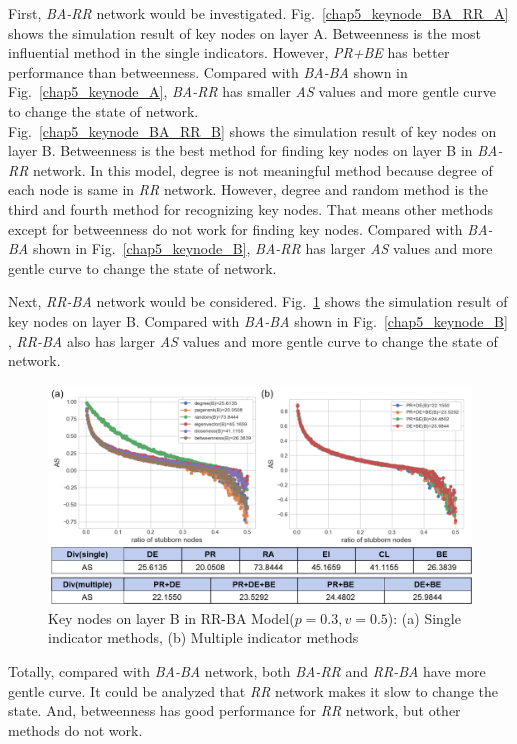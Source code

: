 First, \textit{BA-RR} network would be investigated.
Fig.~\ref{chap5_keynode_BA_RR_A} shows the simulation result of key nodes on layer A. Betweenness is the most influential method in the single indicators. However, \textit{PR+BE} has better performance than betweenness. Compared with \textit{BA-BA} shown in Fig.~\ref{chap5_keynode_A}, \textit{BA-RR} has smaller \textit{AS} values and more gentle curve to change the state of network.\\
Fig.~\ref{chap5_keynode_BA_RR_B} shows the simulation result of key nodes on layer B. Betweenness is the best method for finding key nodes on layer B in \textit{BA-RR} network. In this model, degree is not meaningful method because degree of each node is same in \textit{RR} network. However, degree and random method is the third and fourth method for recognizing key nodes. That means other methods except for betweenness do not work for finding key nodes. 
Compared with \textit{BA-BA} shown in Fig.~\ref{chap5_keynode_B}, \textit{BA-RR} has larger \textit{AS} values and more gentle curve to change the state of network.  


Next, \textit{RR-BA} network would be considered. Fig.~\ref{chap5_keynode_RR_BA_B} shows the simulation result of key nodes on layer B. Compared with \textit{BA-BA} shown in Fig.~\ref{chap5_keynode_B} , \textit{RR-BA} also has larger \textit{AS} values and more gentle curve to change the state of network.  


\begin{figure}[!htb]
	\centering
	\includegraphics[width=\hsize]{figure/chap5_keynode_RR_BA_B.png}
	\caption{Key nodes on layer B in RR-BA Model($p=0.3, v=0.5$):
		(a) Single indicator methods, (b) Multiple indicator methods}
	\label{chap5_keynode_RR_BA_B}
\end{figure}


Totally, compared with \textit{BA-BA} network, both \textit{BA-RR} and \textit{RR-BA} have more gentle curve. It could be analyzed that \textit{RR} network makes it slow to change the state. And, betweenness has good performance for \textit{RR} network, but other methods do not work.   


